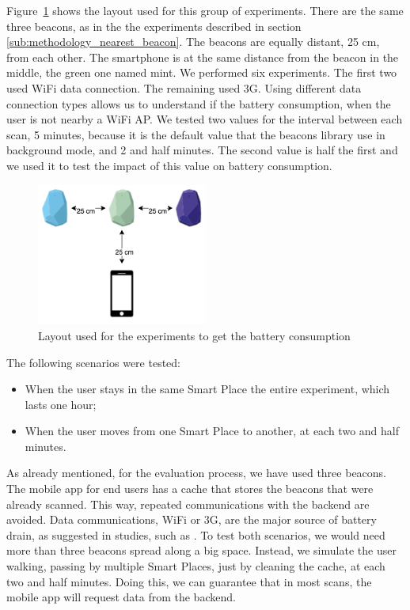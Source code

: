 

Figure~\ref{fig:layout_experiments_battery_consumption} shows the layout used for this group of experiments.
There are the same three beacons, as in the the experiments described in section \ref{sub:methodology_nearest_beacon}. The beacons are equally distant, 25 cm, from each other.
The smartphone is at the same distance from the beacon in the middle, the green one named mint.
We performed six experiments. The first two used \gls{WiFi} data connection. The remaining used \gls{3G}.
Using different data connection types allows us to understand if the battery consumption, when the user is not nearby a \gls{WiFi} \gls{AP}.
We tested two values for the interval between each scan, 5 minutes, because it is the default value that the beacons library use in background mode, and 2 and half minutes.
The second value is half the first and we used it to test the impact of this value on battery consumption.

\begin{figure}[!ht]
  \centering
    \includegraphics[width=0.5\textwidth, keepaspectratio]{images/experiments_battery_layout}
    \caption[Layout for experiments of battery consumption]{Layout used for the experiments to get the battery consumption}
    \label{fig:layout_experiments_battery_consumption}
\end{figure}

The following scenarios were tested:
\begin{itemize}
  \item When the user stays in the same Smart Place the entire experiment, which lasts one hour;
  \item When the user moves from one Smart Place to another, at each two and half minutes.
\end{itemize}

As already mentioned, for the evaluation process, we have used three  beacons.
The mobile app for end users has a cache that stores the beacons that were already scanned.
This way, repeated communications with the backend are avoided.
Data communications, \gls{WiFi} or \gls{3G}, are the major source of battery drain, as suggested in studies, such as \cite{energy}.
To test both scenarios, we would need more than three beacons spread along a big space.
Instead, we simulate the user walking, passing by multiple Smart Places, just by cleaning the cache,
at each two and half minutes.
Doing this, we can guarantee that in most scans, the mobile app will request data from the backend.

